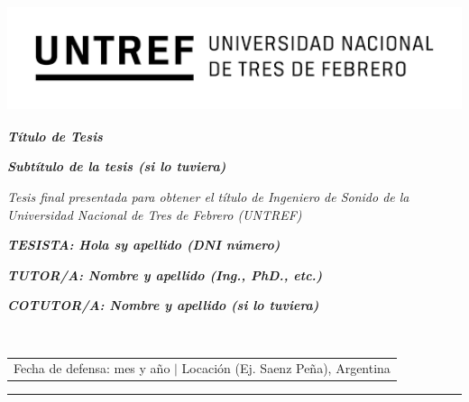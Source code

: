 \documentclass[12pt]{article}
\begin{document}
\begin{titlepage}
\centering
\includegraphics[width=13.58cm, height=3.1cm]{Logo Untref.png} 

\vspace{0.1cm}

\hspace*{-1.31cm}%
\begin{minipage}[t]{16cm}
\centering
{}
\vspace{0.5cm} %

\end{minipage}


\vspace{36pt}

{\bfseries\itshape\fontsize{22pt}{24pt} \selectfont Título de Tesis \par}

\vspace{22pt}

{\itshape\fontsize{18pt}{24pt}\selectfont \textbf{Subtítulo de la tesis (si lo tuviera)} \par}

\vspace{44pt}

{\itshape\fontsize{14pt}{24pt}\selectfont Tesis final presentada para obtener el título de Ingeniero de Sonido de la Universidad Nacional de Tres de Febrero (UNTREF) \par}

\vspace{70pt}

{\bfseries\itshape\fontsize{14pt}{0pt}\selectfont TESISTA: Hola sy apellido (DNI número) \par}
{\bfseries\itshape\fontsize{14pt}{0pt}\selectfont TUTOR/A: Nombre y apellido (Ing., PhD., etc.) \par}
{\bfseries\itshape\fontsize{14pt}{0pt}\selectfont COTUTOR/A: Nombre y apellido (si lo tuviera) \par}

\vfill

\begin{table}[h]
\hrulefill \\ 
\begin{tabular}{c}
Fecha de defensa: mes y año $\lvert$ Locación (Ej. Saenz Peña), Argentina \\
\end{tabular}
\end{table}
\hrule
\end{titlepage}
\end{document}
